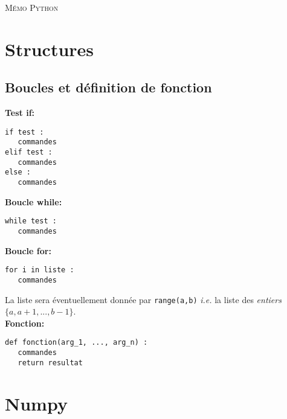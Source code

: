 \documentclass[11pt,a4paper]{article}
\begin{document}
\begin{center}
\begin{LARGE}
\textsc{Mémo Python} 
\end{LARGE}
\end{center}


\section{Structures}



\subsection{Boucles et définition de fonction}

\begin{multicols}{2}
\textbf{Test if:}
\begin{verbatim}
if test :
   commandes
elif test :
   commandes
else :
   commandes
\end{verbatim}

\textbf{Boucle while:}
\begin{verbatim}
while test :
   commandes
\end{verbatim}

\columnbreak
\textbf{Boucle for:}
\begin{verbatim}
for i in liste :
   commandes
\end{verbatim}
La liste sera éventuellement donnée par \verb|range(a,b)| \emph{i.e.} la liste des \emph{entiers} \linebreak $\{a, a+1, ..., b-1\}$. \\

\textbf{Fonction:}
\begin{verbatim}
def fonction(arg_1, ..., arg_n) :
   commandes
   return resultat
\end{verbatim}
\end{multicols}

%
%
%


\section{Numpy}
\end{document}
